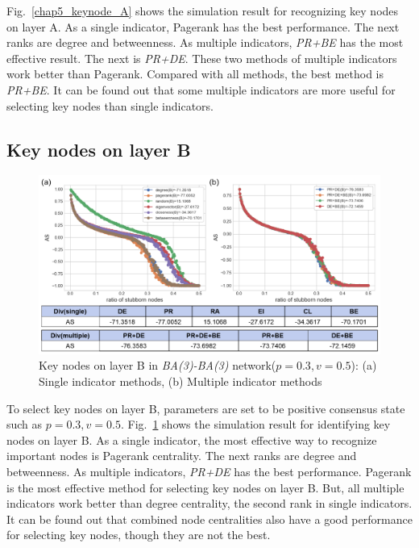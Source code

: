 Fig.~\ref{chap5_keynode_A} shows the simulation result for recognizing key nodes on layer A. As a single indicator, Pagerank has the best performance. The next ranks are degree and betweenness. As multiple indicators, \textit{PR+BE} has the most effective result. The next is \textit{PR+DE}. These two methods of multiple indicators work better than Pagerank. Compared with all methods, the best method is \textit{PR+BE}. It can be found out that some multiple indicators are more useful for selecting key nodes than single indicators. \\

\subsection{Key nodes on layer B}
\label{layerB}
\begin{figure}[!htb]
	\centering
	\includegraphics[width=\hsize]{figure/chap5_keynode_B.png}
	\caption{Key nodes on layer B in \textit{BA(3)-BA(3)} network($p=0.3, v=0.5$): (a) Single indicator methods, (b) Multiple indicator methods}
	\label{chap5_keynode_B}
\end{figure}

To select key nodes on layer B, parameters are set to be positive consensus state such as $p=0.3, v=0.5$. Fig.~\ref{chap5_keynode_B} shows the simulation result for identifying key nodes on layer B. As a single indicator, the most effective way to recognize important nodes is Pagerank centrality. The next ranks are degree and betweenness. As multiple indicators, \textit{PR+DE} has the best performance. Pagerank is the most effective method for selecting key nodes on layer B. But, all multiple indicators work better than degree centrality, the second rank in single indicators. It can be found out that combined node centralities also have a good performance for selecting key nodes, though they are not the best. \\

